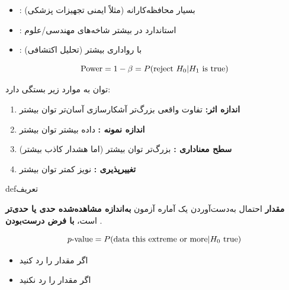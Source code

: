 \begin{itemize}
\tightlist
\item
  : بسیار محافظه‌کارانه (مثلاً ایمنی تجهیزات پزشکی)
\item
  : استاندارد در بیشتر شاخه‌های مهندسی/علوم
\item
  : با رواداری بیشتر (تحلیل اکتشافی)
\end{itemize}


\[\text{Power} = 1 - \beta = P(\text{reject } H_0 | H_1 \text{ is true})\]

توان به موارد زیر بستگی دارد:

\begin{enumerate}
\def\labelenumi{\arabic{enumi}.}
\tightlist
\item
  \textbf{اندازه اثر:} تفاوت واقعی بزرگ‌تر \lr{\ensuremath{\to}} آشکارسازی آسان‌تر \lr{\ensuremath{\to}} توان بیشتر
\item
  \textbf{اندازه نمونه :} داده بیشتر \lr{\ensuremath{\to}} توان بیشتر
\item
  \textbf{سطح معناداری \lr{\ensuremath{\alpha}}:} \lr{\ensuremath{\alpha}} بزرگ‌تر \lr{\ensuremath{\to}} توان بیشتر (اما هشدار کاذب بیشتر)
\item
  \textbf{تغییرپذیری \lr{\ensuremath{\sigma}}:} نویز کمتر \lr{\ensuremath{\to}} توان بیشتر
\end{enumerate}


\begin{PSbox}[unbreakable]{def}{تعریف}

\textbf{مقدار } احتمال به‌دست‌آوردن یک آماره آزمون \textbf{به‌اندازه مشاهده‌شده حدی یا حدی‌تر} است، \textbf{با فرض درست‌بودن }.

\[p\text{-value} = P(\text{data this extreme or more} | H_0 \text{ true})\]

\end{PSbox}


\begin{itemize}
\tightlist
\item
  اگر مقدار  را رد کنید
\item
  اگر مقدار  را رد نکنید
\end{itemize}

